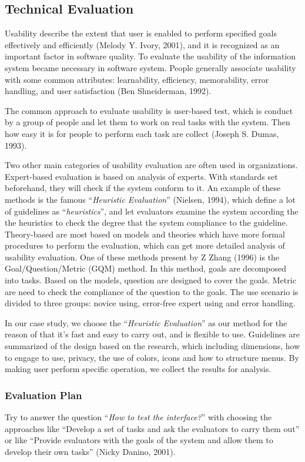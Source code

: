 \documentclass[twocolumn]{article}
\begin{document}
\subsection{Technical Evaluation}
Usability describe the extent that user is enabled to perform specified goals effectively and efficiently (Melody Y. Ivory, 2001), and it is recognized as an important factor in software quality. To evaluate the usability of the information system became necessary in software system. People generally associate usability with some common attributes: learnability, efficiency, memorability, error handling, and user satisfaction (Ben Shneiderman, 1992). 

The common approach to evaluate usability is user-based test, which is conduct by a group of people and let them to work on real tasks with the system. Then how easy it is for people to perform each task are collect (Joseph S. Dumas, 1993).

Two other main categories of usability evaluation are often used in organizations. Expert-based evaluation is based on analysis of experts. With standards set beforehand, they will check if the system conform to it. An example of these methods is the famous “\emph{Heuristic Evaluation}” (Nielsen, 1994), which define a lot of guidelines as “\emph{heuristics}”, and let evaluators examine the system according the the heuristics to check the degree that the system compliance to the guideline. Theory-based are most based on models and theories which have more formal procedures to perform the evaluation, which can get more detailed analysis of usability evaluation. One of these methods present by Z Zhang (1996) is the Goal/Question/Metric (GQM) method. In this method, goals are decomposed into tasks. Based on the models, question are designed to cover the goals. Metric are need to check the compliance of the question to the goals. The use scenario is divided to three groups: novice using, error-free expert using and error handling.

In our case study, we choose the “\emph{Heuristic Evaluation}” as our method for the reason of that it’s fast and easy to carry out, and is flexible to use. Guidelines are summarized of the design based on the research, which including dimensions, how to engage to use, privacy, the use of colors, icons and how to structure menus. By making user perform specific operation, we collect the results for analysis.

\subsubsection{Evaluation Plan}
Try to answer the question “\emph{How to test the interface?}”  with choosing the approaches like “Develop a set of tasks and ask the evaluators to carry them out” or like “Provide evaluators with the goals of the system and allow them to develop their own tasks” (Nicky Danino, 2001).
\end{document}
